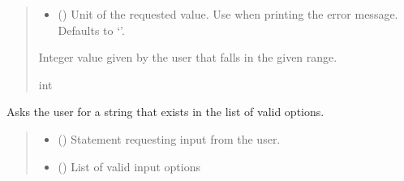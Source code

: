 \documentclass[letterpaper,10pt,english]{sphinxmanual}
\begin{document}
\begin{fulllineitems}
\begin{fulllineitems}
\begin{quote}
\begin{description}
\begin{itemize}
\item {} 
\sphinxAtStartPar
{} (\sphinxstyleliteralemphasis{\sphinxupquote{, }}) \textendash{} Unit of the requested value. Use when printing the error message.                 Defaults to ‘’.

\end{itemize}

\sphinxAtStartPar
Integer value given by the user that falls in the given range.

\sphinxAtStartPar
int

\end{description}\end{quote}

\end{fulllineitems}


\begin{fulllineitems}
\label{\detokenize{Setup.Inputs:Setup.Inputs.GetUserInput.UserInput.AskForStrInList}}
\pysigstartsignatures
{}
\pysigstopsignatures
\sphinxAtStartPar
Asks the user for a string that exists in the list of valid options.
\begin{quote}\begin{description}
\begin{itemize}
\item {} 
\sphinxAtStartPar
{} () \textendash{} Statement requesting input from the user.

\item {} 
\sphinxAtStartPar
{} () \textendash{} List of valid input options


\end{itemize}
\end{description}
\end{quote}
\end{fulllineitems}
\end{fulllineitems}
\end{document}

